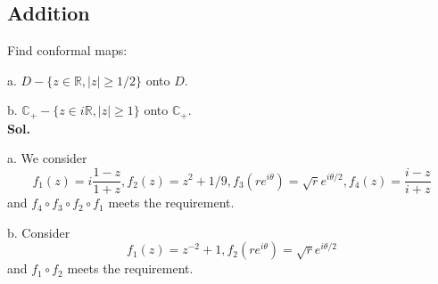 \documentclass[lang=en,11pt,a4paper,citestyle =authoryear]{elegantpaper}
\newcommand{\R}{\mathbb{R}}
\newcommand{\C}{\mathbb{C}}
\begin{document}
\subsection*{Addition} 
Find conformal maps:\par
a. $D - \{z \in \R, |z|\geq 1/2\}$ onto $D$.\par
b. $\C_+ - \{z\in i\R, |z| \geq 1\}$ onto $\C_+$.
\vspace{0.5em}\\
\textbf{Sol.} \par
a. We consider
\[f_1(z) = i\dfrac{1-z}{1+z}, f_2(z) = z^2 + 1/9, f_3(re^{i\theta}) = \sqrt{r}e^{i\theta/2},f_4(z) = \dfrac{i-z}{i+z}\]
and $f_4\circ f_3\circ f_2 \circ f_1$ meets the requirement.\par
b. Consider
\[
f_1(z) = z^{-2}+1, f_2(re^{i\theta}) = \sqrt{r}e^{i\theta/2}
\]
and $f_1\circ f_2$ meets the requirement.
\vspace{0.5em}



\addappheadtotoc
\end{document}
